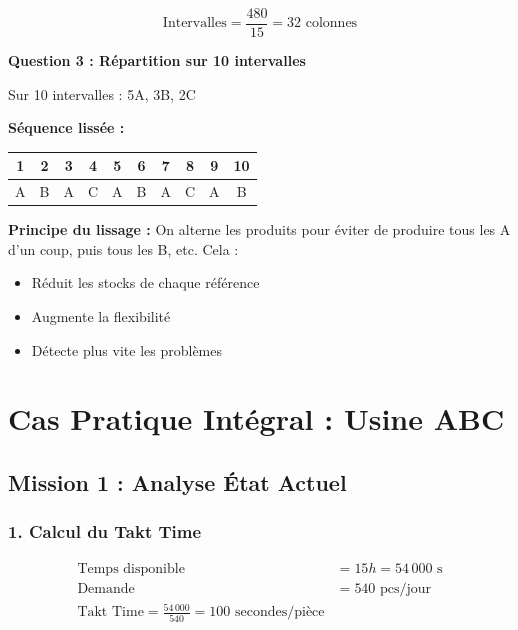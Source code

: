 \documentclass[12pt,a4paper]{article}
\begin{document}
\begin{equation*}
    \text{Intervalles} = \frac{480}{15} = \boxed{32 \text{ colonnes}}
\end{equation*}

\textbf{Question 3 : Répartition sur 10 intervalles}

Sur 10 intervalles : 5A, 3B, 2C

\textbf{Séquence lissée :}

\begin{center}
\begin{tabular}{|c|c|c|c|c|c|c|c|c|c|}
\hline
\textbf{1} & \textbf{2} & \textbf{3} & \textbf{4} & \textbf{5} & \textbf{6} & \textbf{7} & \textbf{8} & \textbf{9} & \textbf{10} \\
\hline
A & B & A & C & A & B & A & C & A & B \\
\hline
\end{tabular}
\end{center}

\begin{tcolorbox}[pedagogique]
\textbf{Principe du lissage :} On alterne les produits pour éviter de produire tous les A d'un coup, puis tous les B, etc. Cela :
\begin{itemize}
    \item Réduit les stocks de chaque référence
    \item Augmente la flexibilité
    \item Détecte plus vite les problèmes
\end{itemize}
\end{tcolorbox}

\newpage

\section{Cas Pratique Intégral : Usine ABC}

\subsection{Mission 1 : Analyse État Actuel}

\subsubsection{1. Calcul du Takt Time}

\begin{align*}
    \text{Temps disponible} &= 15h = 54\,000 \text{ s} \\
    \text{Demande} &= 540 \text{ pcs/jour} \\[0.3cm]
    \boxed{\text{Takt Time} = \frac{54\,000}{540} = 100 \text{ secondes/pièce}}
\end{align*}
\end{document}
